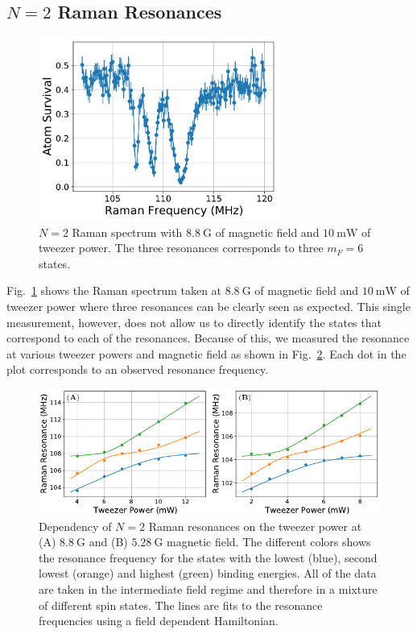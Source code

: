 \subsection{$N=2$ Raman Resonances}
\label{ch:raman-spectroscopy:n2:resonances}

\begin{figure}
  \centering
  \includegraphics[width=0.7\textwidth]{figures/raman_spectroscopy_n2_resonance.pdf}
  \caption[$N=2$ Raman spectrum.]{
    $N=2$ Raman spectrum with $8.8~\mathrm{G}$ of magnetic field
    and $10~\mathrm{mW}$ of tweezer power.
    The three resonances corresponds to three $m_F=6$ states.
    \label{fig:raman-spectroscopy:n2}}
\end{figure}

Fig.~\ref{fig:raman-spectroscopy:n2} shows the Raman spectrum taken
at $8.8~\mathrm{G}$ of magnetic field and $10~\mathrm{mW}$ of tweezer power
where three resonances can be clearly seen as expected.
This single measurement, however, does not allow us to directly identify the states
that correspond to each of the resonances.
Because of this, we measured the resonance at various tweezer powers and magnetic field
as shown in Fig.~\ref{fig:raman-spectroscopy:n2-fit}.
Each dot in the plot corresponds to an observed resonance frequency.

\begin{figure}
  \centering
  \includegraphics[width=\textwidth]{figures/raman_spectroscopy_n2_fit.pdf}
  \caption[$N=2$ Raman resonances and fitting to external field strengths.]{
    Dependency of $N=2$ Raman resonances on the tweezer power at
    (A) $8.8~\mathrm{G}$ and (B) $5.28~\mathrm{G}$ magnetic field.
    The different colors shows the resonance frequency for the states with
    the lowest (blue), second lowest (orange) and highest (green) binding energies.
    All of the data are taken in the intermediate field regime
    and therefore in a mixture of different spin states.
    The lines are fits to the resonance frequencies using a field dependent Hamiltonian.
    \label{fig:raman-spectroscopy:n2-fit}}
\end{figure}

